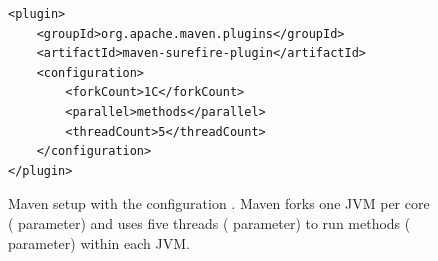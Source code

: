 \begin{figure}[h!]
\centering
\scriptsize
{}
\begin{lstlisting}
<plugin>
    <groupId>org.apache.maven.plugins</groupId>
    <artifactId>maven-surefire-plugin</artifactId>
    <configuration>
        <forkCount>1C</forkCount>
        <parallel>methods</parallel>
        <threadCount>5</threadCount>
    </configuration>
</plugin>
\end{lstlisting}
    \caption{\label{fig:surefire} Maven setup with the configuration
    \ForkParMeth{}.  Maven forks one JVM per core (
    parameter) and uses five threads ( parameter)
    to run methods ( parameter) within each JVM.}
\end{figure}
